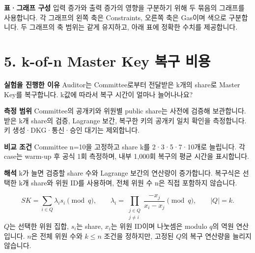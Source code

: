 \documentclass[11pt,a4paper]{article}
\begin{document}
\textbf{표·그래프 구성}\newline
입력 증가와 출력 증가의 영향을 구분하기 위해 두 묶음의 그래프를 사용합니다.\newline
각 그래프의 왼쪽 축은 Constraints, 오른쪽 축은 Gas이며 색으로 구분합니다.\newline
두 그래프의 축 범위는 같게 유지하고, 아래 표에 정확한 수치를 제공합니다.


\noindent\begin{minipage}[t]{0.48\linewidth}
    \vspace{0pt}
    
\end{minipage}\hfill
\begin{minipage}[t]{0.48\linewidth}
    \vspace{0pt}
    
\end{minipage}


\clearpage
{}\section*{5. k-of-n Master Key 복구 비용}
\textbf{실험을 진행한 이유}\newline
Auditor는 Committee로부터 전달받은 k개의 share로 Master Key를 복구합니다.\newline
k값에 따라서 복구 시간이 얼마나 늘어나나요?

\textbf{측정 범위}\newline
Committee의 공개키와 위원별 public share는 사전에 검증해 보관합니다.\newline
받은 k개 share의 검증, Lagrange 보간, 복구한 키의 공개키 일치 확인을 측정합니다.\newline
키 생성·DKG·통신·승인 대기는 제외합니다.

\textbf{비교 조건}\newline
Committee n=10을 고정하고 share k를 2·3·5·7·10개로 늘립니다.\newline
각 case는 warm-up 후 공식 1회 측정하며, 내부 1,000회 복구의 평균 시간을 표시합니다.



\textbf{해석}\newline
k가 늘면 검증할 share 수와 Lagrange 보간의 연산량이 증가합니다.\newline
복구식은 선택한 k개 share와 위원 ID를 사용하며, 전체 위원 수 n은 직접 포함하지 않습니다.

\[
    SK=\sum_{i\in Q}\lambda_i s_i \pmod q,\qquad
    \lambda_i=\prod_{\substack{j\in Q\\j\ne i}}\frac{-x_j}{x_i-x_j}\pmod q,\qquad |Q|=k.
\]
$Q$는 선택한 위원 집합, $s_i$는 share, $x_i$는 위원 ID이며 나눗셈은 modulo $q$의 역원 연산입니다.\newline
$n$은 전체 위원 수와 $k\le n$ 조건을 정하지만, 고정된 $Q$의 복구 연산량을 늘리지 않습니다.
\end{document}
